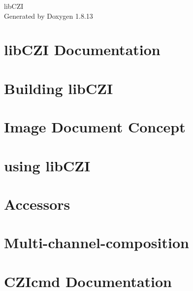 \documentclass[twoside]{book}
\newcommand{\+}{\discretionary{\mbox{\scriptsize$\hookleftarrow$}}{}{}}
\newcommand{\clearemptydoublepage}{%
  \newpage{\pagestyle{empty}\cleardoublepage}%
}
\begin{document}
\hypersetup{pageanchor=false,
             bookmarksnumbered=true,
             pdfencoding=unicode
            }
\begin{titlepage}
\vspace*{7cm}
\begin{center}%
{\Large lib\+C\+ZI }\\
\vspace*{1cm}
{\large Generated by Doxygen 1.8.13}\\
\end{center}
\end{titlepage}
\clearemptydoublepage
{}
\tableofcontents
\clearemptydoublepage
{}
\hypersetup{pageanchor=true}

\chapter{lib\+C\+ZI Documentation}
\label{index}\hypertarget{index}{}
\chapter{Building lib\+C\+ZI}
\label{buildinglib_c_z_i}

\chapter{Image Document Concept}
\label{imagedocumentconcept}

\chapter{using lib\+C\+ZI}
\label{using_naczirlib}

\chapter{Accessors}
\label{accessors}

\chapter{Multi-\/channel-\/composition}
\label{multichannelcomposition}

\chapter{C\+Z\+Icmd Documentation}
\label{naczircmd}

\end{document}
